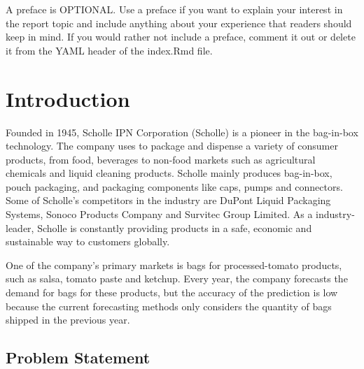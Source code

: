 \documentclass[12pt,oneside]{chicagocapstone}
\begin{document}
  \listoffigures

  \listoftables
  \begin{preface}
    A preface is OPTIONAL. Use a preface if you want to explain your
    interest in the report topic and include anything about your experience
    that readers should keep in mind. If you would rather not include a
    preface, comment it out or delete it from the YAML header of the
    index.Rmd file.
  \end{preface}

\mainmatter %
\pagestyle{fancyplain} %

\chapter*{Introduction}\label{introduction}

Founded in 1945, Scholle IPN Corporation (Scholle) is a pioneer in the
bag-in-box technology. The company uses to package and dispense a
variety of consumer products, from food, beverages to non-food markets
such as agricultural chemicals and liquid cleaning products. Scholle
mainly produces bag-in-box, pouch packaging, and packaging components
like caps, pumps and connectors. Some of Scholle's competitors in the
industry are DuPont Liquid Packaging Systems, Sonoco Products Company
and Survitec Group Limited. As a industry-leader, Scholle is constantly
providing products in a safe, economic and sustainable way to customers
globally.

One of the company's primary markets is bags for processed-tomato
products, such as salsa, tomato paste and ketchup. Every year, the
company forecasts the demand for bags for these products, but the
accuracy of the prediction is low because the current forecasting
methods only considers the quantity of bags shipped in the previous
year.

\section*{Problem Statement}\label{problem_statement}
\end{document}
